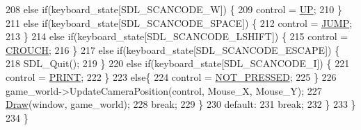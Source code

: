\begin{DoxyCode}
208                                 \textcolor{keywordflow}{else} \textcolor{keywordflow}{if}(keyboard\_state[SDL\_SCANCODE\_W]) \{
209                                     control = \hyperlink{common_8h_a0da83e35f29c11f7f3c637234f2149f9aba595d8bca8bc5e67c37c0a9d89becfa}{UP};
210                                 \}
211                                 \textcolor{keywordflow}{else} \textcolor{keywordflow}{if}(keyboard\_state[SDL\_SCANCODE\_SPACE]) \{
212                                         control = \hyperlink{common_8h_a0da83e35f29c11f7f3c637234f2149f9a1f28d4392b1c1e7da2af2283632d81e1}{JUMP};
213                                 \} 
214                                 \textcolor{keywordflow}{else} \textcolor{keywordflow}{if}(keyboard\_state[SDL\_SCANCODE\_LSHIFT]) \{
215                                         control = \hyperlink{common_8h_a0da83e35f29c11f7f3c637234f2149f9a3cdd4783c5dbeae45bbcd15570a6b273}{CROUCH};
216                                 \}        
217                                 \textcolor{keywordflow}{else} \textcolor{keywordflow}{if}(keyboard\_state[SDL\_SCANCODE\_ESCAPE]) \{
218                                     SDL\_Quit();
219                                 \}
220                                 \textcolor{keywordflow}{else} \textcolor{keywordflow}{if}(keyboard\_state[SDL\_SCANCODE\_I]) \{
221                                         control = \hyperlink{common_8h_a0da83e35f29c11f7f3c637234f2149f9ab107229d44d042caa8ab8df4c8acaa1f}{PRINT};
222                                 \}
223                                 \textcolor{keywordflow}{else}\{
224                                     control = \hyperlink{common_8h_a0da83e35f29c11f7f3c637234f2149f9acdb8b9a398ffbd729218a27d00d8fa45}{NOT\_PRESSED};
225                                 \}
226                                 game\_world->UpdateCameraPosition(control, Mouse\_X, Mouse\_Y);
227                                 \hyperlink{class_game_loop_a5034124015cce5b8ecedae9f906b897b}{Draw}(window, game\_world);
228                                 \textcolor{keywordflow}{break};
229                                 \}
230                 \textcolor{keywordflow}{default}:
231                 \textcolor{keywordflow}{break};
232                  \}
233         \}
234 \}
\end{DoxyCode}


